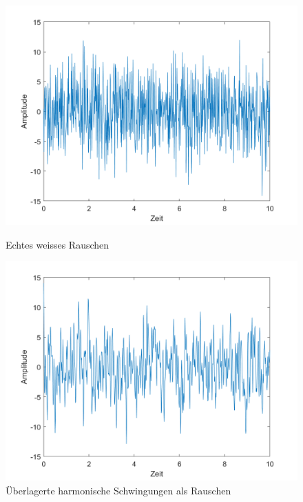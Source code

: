 \begin{figure}
	\centering
	\begin{minipage}{0.45\textwidth}
		\centering
		\includegraphics[width=\linewidth]{papers/brown/images/weissesRauschen.png}
		\caption{Echtes weisses Rauschen}
		\label{brown:weissesRauschenSignal}
	\end{minipage}
	\hspace{0.05\linewidth}
	\begin{minipage}{0.45\textwidth}
		\centering
		\includegraphics[width=\linewidth]{papers/brown/images/RauschenDurchUeberlagerteHarmonsicheSchwingungen.png}
		\caption{Überlagerte harmonische Schwingungen als Rauschen}
		\label{brown:überlagerteSchwingungen}
	\end{minipage}

\end{figure}
